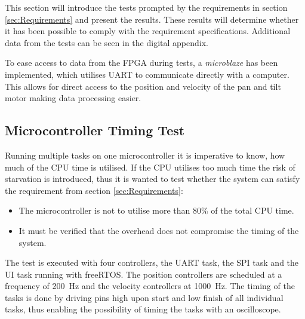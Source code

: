 \documentclass[../../main.tex]{subfiles}
\begin{document}
This section will introduce the tests prompted by the requirements in section \ref{sec:Requirements} and present the results. These results will determine whether it has been possible to comply with the requirement specifications. Additional data from the tests can be seen in the digital appendix. 

To ease access to data from the FPGA during tests, a \textit{microblaze} has been implemented, which utilises UART to communicate directly with a computer. This allows for direct access to the position and velocity of the pan and tilt motor making data processing easier. 

\subsection{Microcontroller Timing Test}
Running multiple tasks on one microcontroller it is imperative to know, how much of the CPU time is utilised. If the CPU utilises too much time the risk of starvation is introduced, thus it is wanted to test whether the system can satisfy the requirement from section \ref{sec:Requirements}: 
\begin{itemize}
    \item The microcontroller is not to utilise more than 80\% of the total CPU time.
    \item It must be verified that the overhead does not compromise the timing of the system.
\end{itemize}

The test is executed with four controllers, the UART task, the SPI task and the UI task running with freeRTOS. The position controllers are scheduled at a frequency of \SI{200}{\hertz} and the velocity controllers at \SI{1000}{\hertz}. The timing of the tasks is done by driving pins high upon start and low finish of all individual tasks, thus enabling the possibility of timing the tasks with an oscilloscope.
\end{document}
